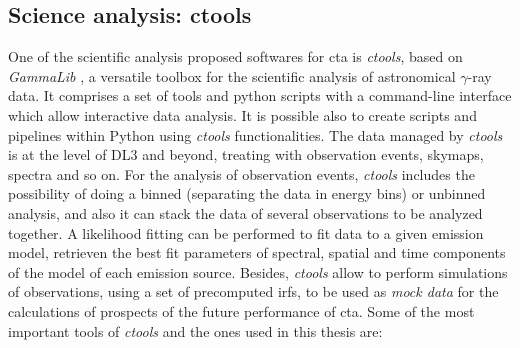 \documentclass[main.tex]{subfiles}
\begin{document}
\subsection{Science analysis: ctools}

One of the scientific analysis proposed softwares for \gls{cta} is \textit{ctools}, based on \textit{GammaLib} \cite{2016ctools}, a versatile toolbox for the scientific analysis of astronomical $\gamma$-ray data. It comprises a set of tools and python scripts with a command-line interface which allow interactive data analysis. It is possible also to create scripts and pipelines within Python using \textit{ctools} functionalities. The data managed by \textit{ctools} is at the level of DL3 and beyond, treating with observation events, skymaps, spectra and so on. For the analysis of observation events, \textit{ctools} includes the possibility of doing a binned (separating the data in energy bins) or unbinned analysis, and also it can stack the data of several observations to be analyzed together. A likelihood fitting can be performed to fit data to a given emission model, retrieven the best fit parameters of spectral, spatial and time components of the model of each emission source. Besides, \textit{ctools} allow to perform simulations of observations, using a set of precomputed \glspl{irf}, to be used as \textit{mock data} for the calculations of prospects of the future performance of \gls{cta}. Some of the most important tools of \textit{ctools} and the ones used in this thesis are:
\end{document}
